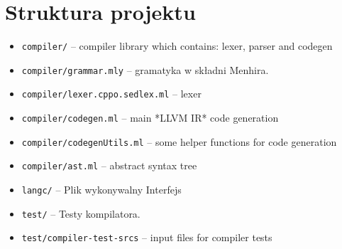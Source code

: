 \documentclass[declaration,shortabstract]{iithesis}
\begin{document}
\section{Struktura projektu}

\begin{itemize}
  \item \texttt{compiler/} -- compiler library which contains: lexer, parser and codegen
  \item \texttt{compiler/grammar.mly} -- gramatyka w składni Menhira.
  \item \texttt{compiler/lexer.cppo.sedlex.ml} -- lexer
  \item \texttt{compiler/codegen.ml} -- main *LLVM IR* code generation
  \item \texttt{compiler/codegenUtils.ml} -- some helper functions for code generation
  \item \texttt{compiler/ast.ml} -- abstract syntax tree
  \item \texttt{langc/} -- Plik wykonywalny Interfejs 
  \item \texttt{test/} -- Testy kompilatora.
  \item \texttt{test/compiler-test-srcs} -- input files for compiler tests
\end{itemize}

\end{document}
